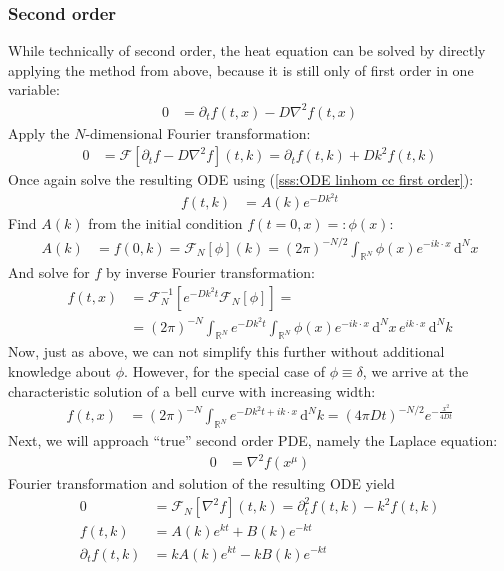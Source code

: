 \documentclass[english, parskip=full]{scrreprt}
\newcommand{\intr}{}
\newcommand{\klam}{}
\begin{document}
\subsubsection{Second order}
While technically of second order, the heat equation can be solved by directly applying the method from above, because it is still only of first order in one variable:
\begin{align*}
0&=\partial_tf(t,x)-D\nabla^2f(t,x)
\end{align*}
Apply the $N$-dimensional Fourier transformation:
\begin{align*}
0&=\mathcal{F}[\partial_tf-D\nabla^2f](t,k)=\partial_tf(t,k)+Dk^2f(t,k)
\end{align*}
Once again solve the resulting ODE using (\ref{sss:ODE linhom cc first order}):
\begin{align*}
f(t,k)&=A(k)e^{-Dk^2t}
\end{align*}
Find $A(k)$ from the initial condition $f(t=0,x)=:\phi(x)$:
\begin{align*}
A(k)&=f(0,k)=\mathcal{F}_N[\phi](k)=(2\pi)^{-N/2}\intr\int_{\mathbb{R}^{N}}{\phi(x)e^{-ik\cdot x}}\,\mathrm{d}^{N}x
\end{align*}
And solve for $f$ by inverse Fourier transformation:
\begin{align*}
f(t,x)&=\mathcal{F}_N^{-1}\klam\left[ {e^{-Dk^2t}\mathcal{F}_N[\phi]} \right]=\\
&=(2\pi)^{-N}\intr\int_{\mathbb{R}^{N}}{e^{-Dk^2t}\intr\int_{\mathbb{R}^{N}}{\phi(x)e^{-ik\cdot x}}\,\mathrm{d}^{N}x}\,e^{ik\cdot x}\,\mathrm{d}^{N}k
\end{align*}
Now, just as above, we can not simplify this further without additional knowledge about $\phi$. However, for the special case of $\phi\equiv\delta$, we arrive at the characteristic solution of a bell curve with increasing width:
\begin{align*}
f(t,x)&=(2\pi)^{-N}\intr\int_{\mathbb{R}^{N}}{e^{-Dk^2t+ik\cdot x}}\,\mathrm{d}^{N}k=(4\pi Dt)^{-N/2}e^{-\frac{x^2}{4Dt}}
\end{align*}
Next, we will approach ``true'' second order PDE, namely the Laplace equation:
\begin{align*}
0&=\nabla^2f(x^\mu)
\end{align*}
Fourier transformation and solution of the resulting ODE yield
\begin{align*}
0&=\mathcal{F}_N[\nabla^2f](t,k)=\partial_t^2f(t,k)-k^2f(t,k)\\
f(t,k)&=A(k)e^{kt}+B(k)e^{-kt}\\
\partial_tf(t,k)&=kA(k)e^{kt}-kB(k)e^{-kt}
\end{align*}
\end{document}
